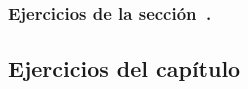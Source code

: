\subsubsection*{Ejercicios de la sección~.}

\begin{enumerate}

\end{enumerate}








\subsection*{Ejercicios del capítulo~}




\begin{enumerate}
    
    
    
    
    
    
    
\end{enumerate}